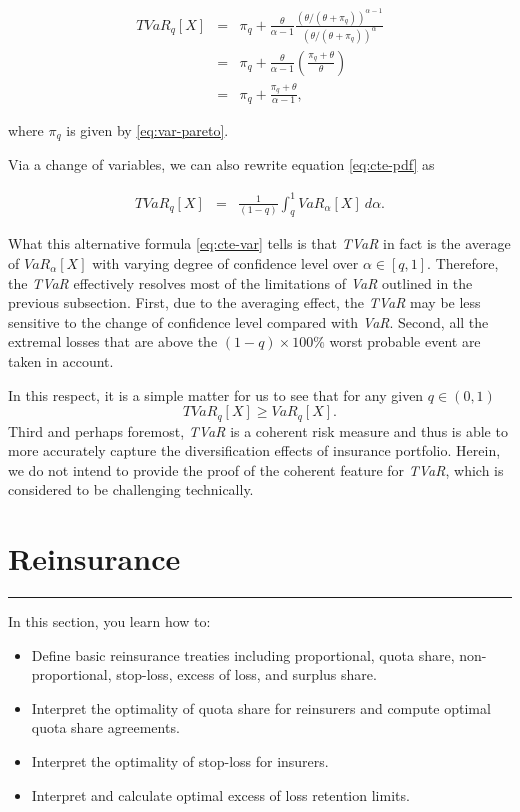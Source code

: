 \documentclass[]{book}
\providecommand{\tightlist}{%
  \setlength{\itemsep}{0pt}\setlength{\parskip}{0pt}}
\theoremstyle{definition}
\theoremstyle{definition}
\theoremstyle{definition}
\theoremstyle{remark}
\begin{document}
\begin{eqnarray*}
  TVaR_q[X] &=& \pi_q+\frac{\theta}{\alpha-1} \frac{(\theta/(\theta+\pi_q))^{\alpha-1}}
{(\theta/(\theta+\pi_q))^{\alpha}}\\
&=&\pi_q +\frac{\theta}{\alpha-1}\left( \frac{\pi_q+\theta}{\theta} \right)\\
&=& \pi_q+\frac{\pi_q+\theta}{\alpha-1},
\end{eqnarray*}

where \(\pi_q\) is given by \eqref{eq:var-pareto}.

Via a change of variables, we can also rewrite equation \eqref{eq:cte-pdf}
as

\begin{eqnarray}
  TVaR_{q}[X] &=& \frac{1}{(1-q)}\int_{q}^{1} VaR_{\alpha}[X]\ d\alpha.
  \label{eq:cte-var}
\end{eqnarray}

What this alternative formula \eqref{eq:cte-var} tells is that \emph{TVaR}
in fact is the average of \(VaR_{\alpha}[X]\) with varying degree of
confidence level over \(\alpha\in [q,1]\). Therefore, the \emph{TVaR}
effectively resolves most of the limitations of \emph{VaR} outlined in
the previous subsection. First, due to the averaging effect, the
\emph{TVaR} may be less sensitive to the change of confidence level
compared with \emph{VaR}. Second, all the extremal losses that are above
the \((1-q)\times 100\%\) worst probable event are taken in account.

In this respect, it is a simple matter for us to see that for any given
\(q\in (0,1)\) \[
TVaR_q[X]\geq VaR_q[X].
\] Third and perhaps foremost, \emph{TVaR} is a coherent risk measure
and thus is able to more accurately capture the diversification effects
of insurance portfolio. Herein, we do not intend to provide the proof of
the coherent feature for \emph{TVaR}, which is considered to be
challenging technically.

\section{Reinsurance}\label{S:Reinsurance}

\begin{center}\rule{0.5\linewidth}{\linethickness}\end{center}

In this section, you learn how to:

\begin{itemize}
\tightlist
\item
  Define basic reinsurance treaties including proportional, quota share,
  non-proportional, stop-loss, excess of loss, and surplus share.
\item
  Interpret the optimality of quota share for reinsurers and compute
  optimal quota share agreements.
\item
  Interpret the optimality of stop-loss for insurers.
\item
  Interpret and calculate optimal excess of loss retention limits.
\end{itemize}
\end{document}
